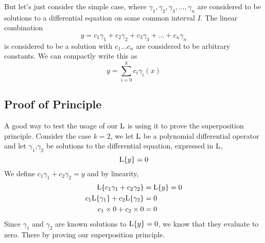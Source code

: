 But let's just consider the simple case, where $\gamma_1, \gamma_2,\gamma_3, ... ,\gamma_n$ are considered to be solutions to a differential equation on some common interval $I$. The linear combination 
\begin{equation*}
	y= c_1\gamma_1 + c_2\gamma_2 + c_3\gamma_3 + ... + c_n\gamma_n
\end{equation*} 
is considered to be a solution with $c_1 ... c_n$ are considered to be arbitrary constants. We can compactly write this as 
\begin{equation*}
	y = \sum_{i=0}^k c_i \gamma_i(x)
\end{equation*}
\subsection{Proof of Principle}
A good way to test the usage of our $\mathrm{L}$ is using it to prove the superposition principle. Consider the case $k=2$, we let $\mathrm{L}$ be a polynomial differential operator and let $\gamma_1$,$\gamma_2$ be solutions to the differential equation, expressed in $\mathrm{L}$,
\begin{equation*}
	\mathrm{L}\{y\}= 0
\end{equation*}
We define $c_1\gamma_1 + c_2\gamma_2 = y$ and by linearity, 
\begin{align*}
	\mathrm{L}\{ c_1\gamma_1 + c_2\gamma_2 \} &= \mathrm{L}\{ y \} = 0 \\ 
	 c_1\mathrm{L}\{\gamma_1\}+ c_2\mathrm{L}\{\gamma_2\} &= 0 \\ 
	 c_1 \times 0 + c_2 \times 0 &= 0   
\end{align*}
Since $\gamma_1$ and $\gamma_2$ are known solutions to $\mathrm{L}\{y\} = 0$, we know that they evaluate to zero. There by proving our superposition principle. 
